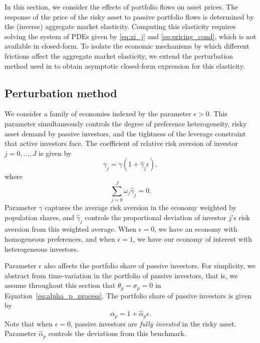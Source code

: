 In this section, we consider the effects of portfolio flows on asset prices. The response of the price of the risky asset to passive portfolio flows is determined by the (inverse) aggregate market elasticity. Computing this elasticity requires solving the system of PDEs given by \eqref{eq:xi_j} and \eqref{eq:pricing_cond}, which is not available in closed-form. To isolate the economic mechanisms by which different frictions affect the aggregate market elasticity, we extend the perturbation method used in \citet{Silva/riskchannel} to obtain asymptotic closed-form expression for this elasticity. 

\subsection{Perturbation method}

We consider a family of economies indexed by the parameter $\epsilon > 0$. This parameter simultaneously controls the degree of preference heterogeneity, 
risky asset demand by passive investors,
and the tightness of the leverage constraint that active investors face. The coefficient of relative risk aversion of investor $j=0,\ldots, J$ is given by 
\begin{equation}\label{eq:gamma-perturb}
    \gamma_j = \gamma ( 1 + \hat{\gamma}_j \epsilon),
\end{equation}
where 
\begin{equation*}
    \sum_{j=0}^J \omega_j \hat{\gamma}_j = 0. 
\end{equation*}
Parameter $\gamma$ captures the average risk aversion in the economy weighted by population shares, and $\hat{\gamma}_j$ controls the proportional deviation of investor $j$'s risk aversion from this weighted average. When $\epsilon = 0$, we have an economy with homogeneous preferences, and when $\epsilon = 1$, we have our economy of interest with heterogeneous investors. 

Parameter $\epsilon$ also affects the portfolio share of passive investors. For simplicity, we abstract from time-variation in the portfolio of passive investors, that is, we assume throughout this section that $\theta_p = \sigma_p = 0$ in Equation~\eqref{eq:alpha_p_process}. The portfolio share of passive investors is given by 
\begin{equation}\label{eq:apbar_index}
    \overline{\alpha}_p = 1 + \hat{\alpha}_p \epsilon.
\end{equation}
Note that when $\epsilon = 0$, passive investors are \textit{fully invested} in the risky asset. Parameter $\hat{\alpha}_p$ controls the deviations from this benchmark. 

